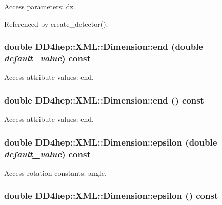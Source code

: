 Access parameters: dz. 

Referenced by create\_\-detector().\hypertarget{struct_d_d4hep_1_1_x_m_l_1_1_dimension_a7629361b8d14c63f2a23513826ad122b}{
\subsubsection[{end}]{\setlength{\rightskip}{0pt plus 5cm}double DD4hep::XML::Dimension::end (double {\em default\_\-value}) const}}
\label{struct_d_d4hep_1_1_x_m_l_1_1_dimension_a7629361b8d14c63f2a23513826ad122b}


Access attribute values: end. \hypertarget{struct_d_d4hep_1_1_x_m_l_1_1_dimension_a7c7b894e88525a4348f1130f9e1617d1}{
\subsubsection[{end}]{\setlength{\rightskip}{0pt plus 5cm}double DD4hep::XML::Dimension::end () const}}
\label{struct_d_d4hep_1_1_x_m_l_1_1_dimension_a7c7b894e88525a4348f1130f9e1617d1}


Access attribute values: end. \hypertarget{struct_d_d4hep_1_1_x_m_l_1_1_dimension_adceda3c2c92d5361fff7189da5e5feb8}{
\subsubsection[{epsilon}]{\setlength{\rightskip}{0pt plus 5cm}double DD4hep::XML::Dimension::epsilon (double {\em default\_\-value}) const}}
\label{struct_d_d4hep_1_1_x_m_l_1_1_dimension_adceda3c2c92d5361fff7189da5e5feb8}


Access rotation constants: angle. \hypertarget{struct_d_d4hep_1_1_x_m_l_1_1_dimension_aaf9ced472cc0e602d162e32197d314a5}{
\subsubsection[{epsilon}]{\setlength{\rightskip}{0pt plus 5cm}double DD4hep::XML::Dimension::epsilon () const}}
\label{struct_d_d4hep_1_1_x_m_l_1_1_dimension_aaf9ced472cc0e602d162e32197d314a5}


